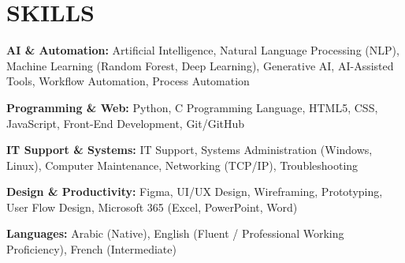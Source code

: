 \documentclass[10.5pt, letterpaper]{article}
\begin{document}
\section{SKILLS}
\noindent\textbf{AI \& Automation:} Artificial Intelligence, Natural Language Processing (NLP), Machine Learning (Random Forest, Deep Learning), Generative AI, AI-Assisted Tools, Workflow Automation, Process Automation\par
\noindent\textbf{Programming \& Web:} Python, C Programming Language, HTML5, CSS, JavaScript, Front-End Development, Git/GitHub\par
\noindent\textbf{IT Support \& Systems:} IT Support, Systems Administration (Windows, Linux), Computer Maintenance, Networking (TCP/IP), Troubleshooting\par
\noindent\textbf{Design \& Productivity:} Figma, UI/UX Design, Wireframing, Prototyping, User Flow Design, Microsoft 365 (Excel, PowerPoint, Word)\par
\noindent\textbf{Languages:} Arabic (Native), English (Fluent / Professional Working Proficiency), French (Intermediate)
\end{document}
